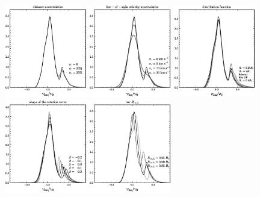 \clearpage
\begin{figure}
\includegraphics[width=0.32\textwidth]{figs_hercules/distuncertain.ps}
\includegraphics[width=0.32\textwidth]{figs_hercules/vlosuncertain.ps}
\includegraphics[width=0.32\textwidth]{figs_hercules/df.ps}\\
\includegraphics[width=0.32\textwidth]{figs_hercules/slope.ps}
\includegraphics[width=0.32\textwidth]{figs_hercules/rolr.ps}

\end{figure}

